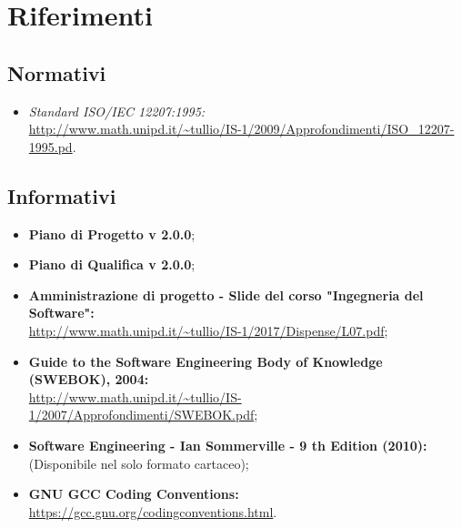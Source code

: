\documentclass[./NormediProgetto.tex]{subfiles}
\begin{document}
\section{Riferimenti}

\subsection{Normativi}

\begin{itemize}
	\item \textit{Standard ISO/IEC 12207:1995:}\\
	 \url{http://www.math.unipd.it/~tullio/IS-1/2009/Approfondimenti/ISO_12207-1995.pd}.
\end{itemize}

\subsection{Informativi}

\begin{itemize}
	\item \textbf{Piano di Progetto v 2.0.0};
	\item \textbf{Piano di Qualifica v 2.0.0};
	\item \textbf{Amministrazione di progetto - Slide del corso "Ingegneria del
	Software":}\\	\url{http://www.math.unipd.it/~tullio/IS-1/2017/Dispense/L07.pdf};
	\item \textbf{Guide to the Software Engineering Body of Knowledge (SWEBOK), 2004:}\\
	\url{http://www.math.unipd.it/~tullio/IS-1/2007/Approfondimenti/SWEBOK.pdf};
	\item \textbf{Software Engineering - Ian Sommerville - 9 th Edition (2010):}\\
	(Disponibile nel solo formato cartaceo);
	\item \textbf{GNU GCC Coding Conventions:}\\ \url{https://gcc.gnu.org/codingconventions.html}.
\end{itemize}
\end{document}
